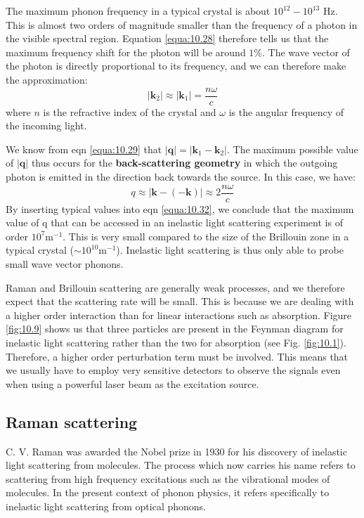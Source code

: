 \documentclass[12pt]{book}
\begin{document}
{The maximum phonon frequency in a typical crystal is about $10^{12} -10^{13}$ Hz. This is almost two orders of magnitude smaller than the frequency of a photon in the visible spectral region. Equation \ref{equa:10.28} therefore tells us that the maximum frequency shift for the photon will be around $1\%$. The wave vector of the photon is directly proportional to its frequency, and we can therefore make the approximation:
\begin{equation}\label{equa:10.31}
  |\mathbf{k}_2|\approx|\mathbf{k}_1|=\frac{n\omega}{c}
\end{equation}
where $n$ is the refractive index of the crystal and $\omega$ is the angular frequency of the incoming light.

We know from eqn \ref{equa:10.29} that $|\mathbf{q}|=|\mathbf{k}_1-\mathbf{k}_2|$. The maximum possible value of $|\mathbf{q}|$ thus occurs for the \textbf{back-scattering geometry} in which the outgoing photon is emitted in the direction back towards the source. In this case, we have:
\begin{equation}\label{equa:10.32}
  q\approx|\mathbf{k}-(-\mathbf{k})|\approx2\frac{n\omega}{c}
\end{equation}
By inserting typical values into eqn \ref{equa:10.32}, we conclude that the maximum value of q that can be accessed in an inelastic light scattering experiment is of order $10^7 \mathrm{m^{-1}}$. This is very small compared to the size of the Brillouin zone in a typical crystal ($\sim10^{10}\mathrm{m^{-1}}$). Inelastic light scattering is thus only able to probe small wave vector phonons.

Raman and Brillouin scattering are generally weak processes, and we therefore expect that the scattering rate will be small. This is because we are dealing with a higher order interaction than for linear interactions such as absorption. Figure \ref{fig:10.9} shows us that three particles are present in the Feynman diagram for inelastic light scattering rather than the two for absorption (see Fig. \ref{fig:10.1}). Therefore, a higher order perturbation term must be involved. This means that we usually have to employ very sensitive detectors to observe the signals even when using a powerful laser beam as the excitation source.

\subsection{Raman scattering}
C. V. Raman was awarded the Nobel prize in 1930 for his discovery of inelastic light scattering from molecules. The process which now carries his name refers to scattering from high frequency excitations such as the vibrational modes of molecules. In the present context of phonon physics, it refers specifically to inelastic light scattering from optical phonons.

}
\end{document}
